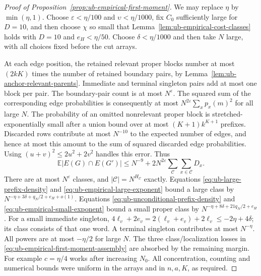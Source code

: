 \documentclass[11pt]{article}
\numberwithin{equation}{section}
\newcommand{\E}{\mathbb E}
\newcommand{\1}{\mathbf 1}
\begin{document}
\begin{proof}[Proof of Proposition~\ref{prop:ub-empirical-first-moment}]
We may replace $\eta$ by $\min(\eta,1)$. Choose
$\varepsilon<\eta/100$ and $\upsilon<\eta/1000$, fix $C_0$
sufficiently large for $D=10$, and then choose $\chi$ so small
that Lemma~\ref{lem:ub-empirical-cost-classes} holds with $D=10$ and
$e_H<\eta/50$. Choose $\delta<\eta/1000$ and then take $N$ large,
with all choices fixed before the cut arrays.

At each edge position, the retained relevant proper blocks number at
most $(2kK)$ times the number of retained boundary pairs, by
Lemma~\ref{lem:ub-anchor-relevant-parents}. Immediate and terminal singleton pairs
add at most one block per pair. The boundary-pair count is at most
$N^\varepsilon$. The squared sum of the corresponding edge probabilities
is consequently at most
$N^{2\varepsilon}\sum_x p_x(m)^2$ for all large $N$.
The probability of an omitted nonrelevant proper block is stretched-exponentially
small after a union bound over at most $(K+1)k^{K+1}$ prefixes.
Discarded rows contribute at most $N^{-10}$ to the expected number of
edges, and hence at most this amount to the sum of squared discarded
edge probabilities. Using $(u+v)^2\le2u^2+2v^2$ handles this error.
Thus
\begin{equation}
\label{eq:ub-empirical-first-moment-assembly}
 \E|E(G)\cap E(G')|
 \le N^{-9}+2N^{2\varepsilon}
        \sum_{\mathcal C}\sum_{x\in\mathcal C}D_x.
\end{equation}
There are at most $N^\varepsilon$ classes, and
$|\mathcal C|=N^{H_{\mathcal C}}$ exactly. Equations
\eqref{eq:ub-large-prefix-density} and
\eqref{eq:ub-empirical-large-exponent} bound a large class by
$N^{-\eta+3\delta+q_N/2+e_H+o(1)}$.
Equations \eqref{eq:ub-unconditional-prefix-density} and
\eqref{eq:ub-empirical-small-exponent} bound a small proper class by
$N^{-\eta+8\delta+21q_N/2+e_H}$.
For a small immediate singleton,
$4\ell_v+2e_v=2(\ell_v+e_v)+2\ell_v\le-2\eta+4\delta$;
its class consists of that one word. A terminal singleton contributes
at most $N^{-\eta}$. All powers are at most $-\eta/2$ for large $N$.
The three class/localization losses in
\eqref{eq:ub-empirical-first-moment-assembly} are absorbed by the
remaining margin. For example $c=\eta/4$ works after increasing $N_0$.
All concentration, counting and numerical bounds were uniform in the
arrays and in $n,a,K$, as required.
\end{proof}
\end{document}
